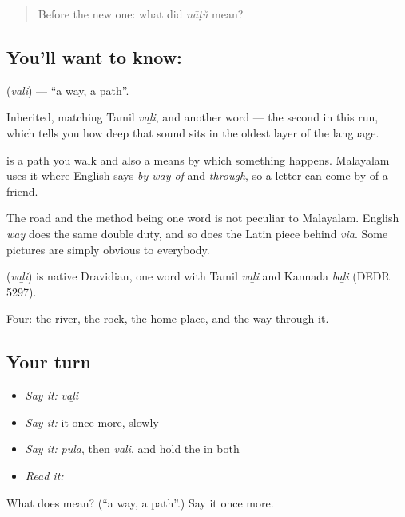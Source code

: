 \label{lesson:ML-C55-path}



\begin{quote}
Before the new one: what did \emph{nāṭŭ} mean?
\end{quote}

\subsection*{You'll want to know: }
\textbf{} (\emph{vaḻi}) — \textquotedblleft{}a way, a path\textquotedblright{}.

Inherited, matching Tamil \emph{vaḻi}, and another  word — the second in this run, which tells you how deep that sound sits in the oldest layer of the language.

 is a path you walk and also a means by which something happens. Malayalam uses it where English says \emph{by way of} and \emph{through}, so a letter can come by  of a friend.

The road and the method being one word is not peculiar to Malayalam. English \emph{way} does the same double duty, and so does the Latin piece behind \emph{via}. Some pictures are simply obvious to everybody.

\begin{cousinweb}
\textbf{} (\emph{vaḻi}) is native Dravidian, one word with Tamil \emph{vaḻi} and Kannada \emph{baḻi} (DEDR 5297).
\end{cousinweb}

\begin{grammarlens}[title={What you've built}]
Four: the river, the rock, the home place, and the way through it.
\end{grammarlens}

\subsection*{Your turn}
\begin{itemize}
\raggedright
  \item \emph{Say it:} \emph{vaḻi}
  \item \emph{Say it:} it once more, slowly
  \item \emph{Say it:} \emph{puḻa}, then \emph{vaḻi}, and hold the  in both
  \item \emph{Read it:} \textbf{}
\end{itemize}

\begin{tcolorbox}[breakable,colback=teal!4,colframe=teal!35!black,title={Before you move on}]
What does  mean? (\textquotedblleft{}a way, a path\textquotedblright{}.) Say it once more.
\end{tcolorbox}
